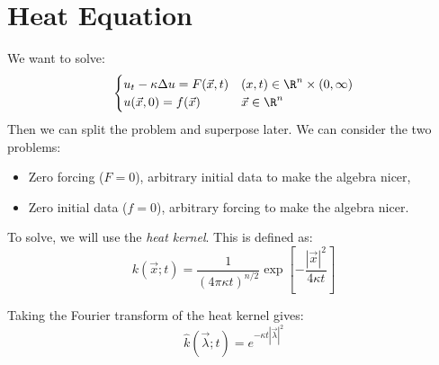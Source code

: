 \documentclass[../Main.tex]{subfiles}
\begin{document}
\section{Heat Equation}
We want to solve:
\begin{equation}
    \begin{cases}
        u_t - \kappa \Delta u = F(\vec{x}, t) & (x, t) \in \R^n \times (0, \infty) \\
        u(\vec{x}, 0) = f(\vec{x}) & \vec{x} \in \R^n
    \end{cases}
    \label{eqnHeatUnbounded}
\end{equation}
Then we can split the problem and superpose later. We can consider the two problems:
\begin{itemize}
    \item Zero forcing ($F = 0$), arbitrary initial data to make the algebra nicer,
    \item Zero initial data ($f = 0$), arbitrary forcing to make the algebra nicer.
\end{itemize}
To solve, we will use the \textit{heat kernel}. This is defined as:
\begin{equation}
    k(\vec{x};t) = \frac{1}{(4 \pi \kappa t)^{n / 2}} \exp\left[-\frac{|\vec{x}|^2}{4 \kappa t}\right]
    \label{eqnHeatKernel}
\end{equation}
\begin{proposition}
    Taking the Fourier transform of the heat kernel gives:
    \begin{equation*}
        \hat{k}(\vec{\lambda};t) = e^{-\kappa t |\vec{\lambda}|^2}
    \end{equation*}
    \label{propHeatKernelFT}
\end{proposition}
\end{document}
